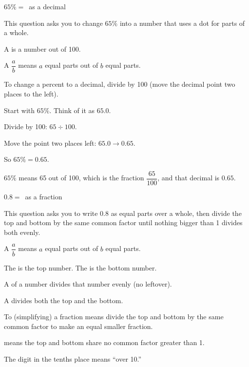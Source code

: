 
$65\% = $\ansblank[1.8cm]\ as a decimal


This question asks you to change $65\%$ into a number that uses a dot for parts of a whole.

\begin{words}
  \item A is a number out of 100.
  \item A $\dfrac{a}{b}$ means $a$ equal parts out of $b$ equal parts.
  \item To change a percent to a decimal, divide by 100 (move the decimal point two places to the left).
\end{words}

\begin{steps}
  \item Start with $65\%$. Think of it as $65.0$.
  \item Divide by 100: $65 \div 100$.
  \item Move the point two places left: $65.0 \to 0.65$.
  \item So $65\% = 0.65$.
\end{steps}


$65\%$ means 65 out of 100, which is the fraction $\dfrac{65}{100}$, and that
decimal is $0.65$.


$0.8 = $\ansblank[1.8cm]\ as a fraction


This question asks you to write $0.8$ as equal parts over a whole, then divide the
top and bottom by the same common factor until nothing bigger than 1 divides both
evenly.

\begin{words}
  \item A $\dfrac{a}{b}$ means $a$ equal parts out of $b$ equal parts.
  \item The is the top number. The is the bottom number.
  \item A of a number divides that number evenly (no leftover).
  \item A divides both the top and the bottom.
  \item To (simplifying) a fraction means divide the top and bottom
        by the same common factor to make an equal smaller fraction.
  \item {}means the top and bottom share no common factor greater than 1.
  \item The digit in the tenths place means ``over 10.''
\end{words}

